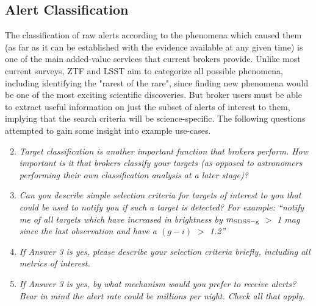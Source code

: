 \documentclass{article}
\begin{document}
\subsection{Alert Classification}
The classification of raw alerts according to the phenomena which caused them (as far as it can be established with the evidence available at any given time) is one of the main added-value services that current brokers provide.  Unlike most current surveys, ZTF and LSST aim to categorize all possible phenomena, including identifying the "rarest of the rare", since finding new phenomena would be one of the most exciting scientific discoveries.  But broker users must be able to extract useful information on just the subset of alerts of interest to them, implying that the search criteria will be science-specific.  The following questions attempted to gain some insight into example use-cases.  

\begin{enumerate}
\setcounter{enumi}{1}
\item {\em Target classification is another important function that brokers perform. How important is it that brokers classify your targets (as opposed to astronomers performing their own classification analysis at a later stage)? }
\item {\em Can you describe simple selection criteria for targets of interest to you that could be used to notify you if such a target is detected? For example: “notify me of all targets which have increased in brightness by $m_{\rm{SDSS-g}}$ $>$ 1 mag since the last observation and have a $(g-i)$ $>$ 1.2''}
\item {\em If Answer 3 is yes, please describe your selection criteria briefly, including all metrics of interest.}
\item {\em If Answer 3 is yes, by what mechanism would you prefer to receive alerts?  Bear in mind the alert rate could be millions per night. Check all that apply.}
\end{enumerate}
\end{document}
